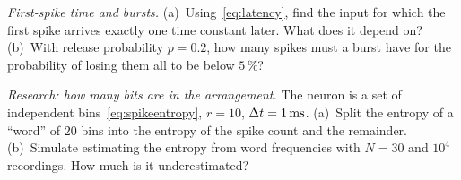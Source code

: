 \begin{exercise}[\lvlA]
\label{ex:04:6}
\emph{First-spike time and bursts.} (a)~Using~\eqref{eq:latency}, find the input for which the first spike arrives exactly one time constant later. What does it depend on? (b)~With release probability $p=0.2$, how many spikes must a burst have for the probability of losing them all to be below $5\,\%$?
\end{exercise}

\begin{exercise}[\lvlC]
\label{ex:04:7}
\emph{Research: how many bits are in the arrangement.} The neuron is a set of independent bins~\eqref{eq:spikeentropy}, $r=10$, $\Delta t=1\,\text{ms}$. (a)~Split the entropy of a ``word'' of $20$ bins into the entropy of the spike count and the remainder. (b)~Simulate estimating the entropy from word frequencies with $N=30$ and $10^4$ recordings. How much is it underestimated?
\end{exercise}

